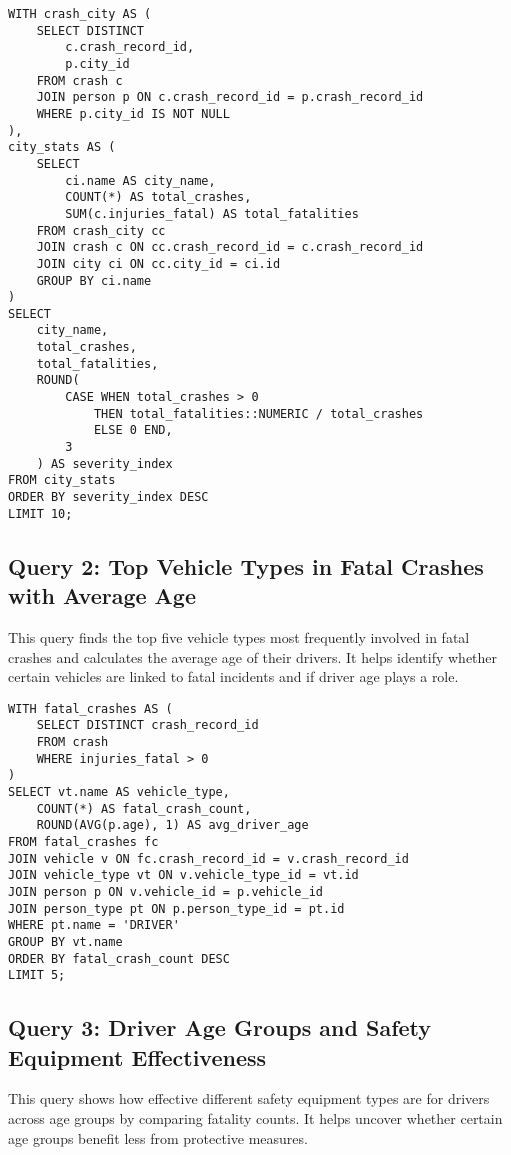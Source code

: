 \documentclass[12pt]{article}
\begin{document}
{\scriptsize
\begin{verbatim}
WITH crash_city AS (
    SELECT DISTINCT
        c.crash_record_id,
        p.city_id
    FROM crash c
    JOIN person p ON c.crash_record_id = p.crash_record_id
    WHERE p.city_id IS NOT NULL
),
city_stats AS (
    SELECT
        ci.name AS city_name,
        COUNT(*) AS total_crashes,
        SUM(c.injuries_fatal) AS total_fatalities
    FROM crash_city cc
    JOIN crash c ON cc.crash_record_id = c.crash_record_id
    JOIN city ci ON cc.city_id = ci.id
    GROUP BY ci.name
)
SELECT
    city_name,
    total_crashes,
    total_fatalities,
    ROUND(
        CASE WHEN total_crashes > 0
            THEN total_fatalities::NUMERIC / total_crashes
            ELSE 0 END,
        3
    ) AS severity_index
FROM city_stats
ORDER BY severity_index DESC
LIMIT 10;
\end{verbatim}}

\subsection{Query 2: Top Vehicle Types in Fatal Crashes with Average Age}

This query finds the top five vehicle types most frequently involved in fatal crashes and calculates the average age of their drivers. It helps identify whether certain vehicles are linked to fatal incidents and if driver age plays a role.

{\scriptsize
\begin{verbatim}
WITH fatal_crashes AS (
    SELECT DISTINCT crash_record_id
    FROM crash
    WHERE injuries_fatal > 0
)
SELECT vt.name AS vehicle_type,
    COUNT(*) AS fatal_crash_count,
    ROUND(AVG(p.age), 1) AS avg_driver_age
FROM fatal_crashes fc
JOIN vehicle v ON fc.crash_record_id = v.crash_record_id
JOIN vehicle_type vt ON v.vehicle_type_id = vt.id
JOIN person p ON v.vehicle_id = p.vehicle_id
JOIN person_type pt ON p.person_type_id = pt.id
WHERE pt.name = 'DRIVER'
GROUP BY vt.name
ORDER BY fatal_crash_count DESC
LIMIT 5;
\end{verbatim}}



\subsection{Query 3: Driver Age Groups and Safety Equipment Effectiveness}

This query shows how effective different safety equipment types are for drivers across age groups by comparing fatality counts. It helps uncover whether certain age groups benefit less from protective measures.
\end{document}
